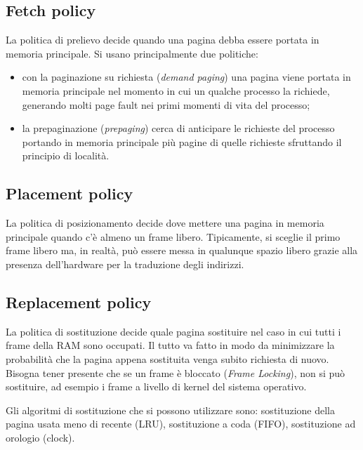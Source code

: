 \subsection*{Fetch policy}
La politica di prelievo decide quando una pagina debba essere portata in memoria principale. Si usano principalmente due politiche:
\begin{itemize}
    \item con la paginazione su richiesta (\textit{demand paging}) una pagina viene portata in memoria principale nel momento in cui un qualche processo la richiede, generando molti page fault nei primi momenti di vita del processo;
    \item la prepaginazione (\textit{prepaging}) cerca di anticipare le richieste del processo portando in memoria principale più pagine di quelle richieste sfruttando il principio di località.
\end{itemize}

\subsection*{Placement policy}
La politica di posizionamento decide dove mettere una pagina in memoria principale quando c'è almeno un frame libero. Tipicamente, si sceglie il primo frame libero ma, in realtà, può essere messa in qualunque spazio libero grazie alla presenza dell'hardware per la traduzione degli indirizzi.

\subsection*{Replacement policy}
La politica di sostituzione decide quale pagina sostituire nel caso in cui tutti i frame della RAM sono occupati. Il tutto va fatto in modo da minimizzare la probabilità che la pagina appena sostituita venga subito richiesta di nuovo.
Bisogna tener presente che se un frame è bloccato (\textit{Frame Locking}), non si può sostituire, ad esempio i frame a livello di kernel del sistema operativo.

Gli algoritmi di sostituzione che si possono utilizzare sono: sostituzione della pagina usata meno di recente (LRU), sostituzione a coda (FIFO), sostituzione ad orologio (clock).

